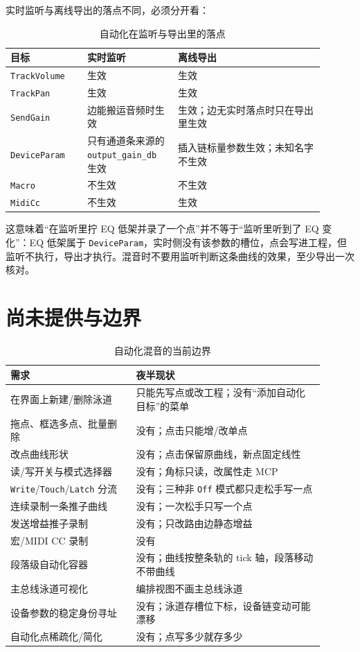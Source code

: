 实时监听与离线导出的落点不同，必须分开看：

\begin{table}[htbp]
\centering
\small
\begin{tabular}{@{}p{0.22\linewidth}p{0.26\linewidth}p{0.42\linewidth}@{}}
\hline
目标 & 实时监听 & 离线导出 \\
\hline
\texttt{TrackVolume} & 生效 & 生效 \\
\texttt{TrackPan} & 生效 & 生效 \\
\texttt{SendGain} & 边能搬运音频时生效 & 生效；边无实时落点时只在导出里生效 \\
\texttt{DeviceParam} & 只有通道条来源的 \texttt{output\_gain\_db} 生效 & 插入链标量参数生效；未知名字不生效 \\
\texttt{Macro} & 不生效 & 不生效 \\
\texttt{MidiCc} & 不生效 & 生效 \\
\hline
\end{tabular}
\caption{自动化在监听与导出里的落点}
\label{tab:automation-apply}
\end{table}

这意味着“在监听里拧 EQ 低架并录了一个点”并不等于“监听里听到了 EQ 变化”：EQ 低架属于 \texttt{DeviceParam}，实时侧没有该参数的槽位，点会写进工程，但监听不执行，导出才执行。混音时不要用监听判断这条曲线的效果，至少导出一次核对。

\section{尚未提供与边界}

\begin{table}[htbp]
\centering
\small
\begin{tabular}{@{}p{0.36\linewidth}p{0.54\linewidth}@{}}
\hline
需求 & 夜半现状 \\
\hline
在界面上新建/删除泳道 & 只能先写点或改工程；没有“添加自动化目标”的菜单 \\
拖点、框选多点、批量删除 & 没有；点击只能增/改单点 \\
改点曲线形状 & 没有；点击保留原曲线，新点固定线性 \\
读/写开关与模式选择器 & 没有；角标只读，改属性走 MCP \\
\texttt{Write}/\texttt{Touch}/\texttt{Latch} 分流 & 没有；三种非 \texttt{Off} 模式都只走松手写一点 \\
连续录制一条推子曲线 & 没有；一次松手只写一个点 \\
发送增益推子录制 & 没有；只改路由边静态增益 \\
宏/MIDI CC 录制 & 没有 \\
段落级自动化容器 & 没有；曲线按整条轨的 tick 轴，段落移动不带曲线 \\
主总线泳道可视化 & 编排视图不画主总线泳道 \\
设备参数的稳定身份寻址 & 没有；泳道存槽位下标，设备链变动可能漂移 \\
自动化点稀疏化/简化 & 没有；点写多少就存多少 \\
\hline
\end{tabular}
\caption{自动化混音的当前边界}
\label{tab:automation-gaps}
\end{table}

